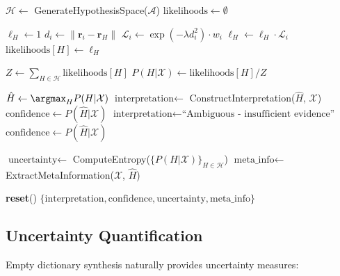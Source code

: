 \documentclass[12pt,a4paper]{article}
\begin{document}
\begin{algorithm}[H]
\caption{Empty Dictionary Semantic Synthesis}
\begin{algorithmic}[1]
\State $\mathcal{H} \leftarrow$ GenerateHypothesisSpace($\mathcal{A}$) 
\State $\text{likelihoods} \leftarrow \emptyset$

 
    \State $\ell_H \leftarrow 1$ 
        \State $d_i \leftarrow \|\mathbf{r}_i - \mathbf{r}_H\|$ 
        \State $\mathcal{L}_i \leftarrow \exp(-\lambda d_i^2) \cdot w_i$ 
        \State $\ell_H \leftarrow \ell_H \cdot \mathcal{L}_i$
    \EndFor
    \State $\text{likelihoods}[H] \leftarrow \ell_H$
\EndFor

\State $Z \leftarrow \sum_{H \in \mathcal{H}} \text{likelihoods}[H]$ 
    \State $P(H | \mathcal{X}) \leftarrow \text{likelihoods}[H] / Z$ 
\EndFor

\State $\hat{H} \leftarrow \argmax_{H} P(H | \mathcal{X})$ 
    \State $\text{interpretation} \leftarrow$ ConstructInterpretation($\hat{H}$, $\mathcal{X}$)
    \State $\text{confidence} \leftarrow P(\hat{H} | \mathcal{X})$
\Else
    \State $\text{interpretation} \leftarrow \text{``Ambiguous - insufficient evidence''}$
    \State $\text{confidence} \leftarrow P(\hat{H} | \mathcal{X})$
\EndIf

\State $\text{uncertainty} \leftarrow$ ComputeEntropy($\{P(H | \mathcal{X})\}_{H \in \mathcal{H}}$)
\State $\text{meta\_info} \leftarrow$ ExtractMetaInformation($\mathcal{X}$, $\hat{H}$)

\State \textbf{reset}() 
\State \Return $\{\text{interpretation}, \text{confidence}, \text{uncertainty}, \text{meta\_info}\}$
\EndProcedure
\end{algorithmic}
\end{algorithm}

\subsection{Uncertainty Quantification}

Empty dictionary synthesis naturally provides uncertainty measures:
\end{document}
